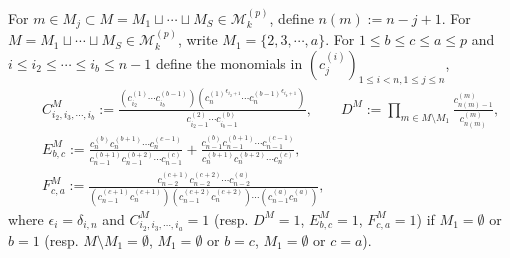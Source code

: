 For $m\in M_j\subset M=M_1\sqcup{\cdots}\sqcup M_S\in{\mathcal M}^{(p)}_k$, 
define $n(m):=n-j+1$.
For $M=M_1\sqcup{\cdots}\sqcup M_S\in{\mathcal M}^{(p)}_k$, write
$M_1=\{2,3,{\cdots},a\}$. 
For 
$1\leq b\leq c\leq a\leq p$ and $i\leq i_2\leq {\cdots}\leq i_b\leq n-1$
define the monomials in $({c_{j}^{(i)}})_{1\leq i<n,1\leq j\leq n}$, 
\begin{eqnarray}
&&C_{i_2,i_3,{\cdots},i_b}^M:=
\frac{({c_{i_2}^{(1)}}{\cdots}{c_{i_b}^{(b-1)}})({{c_{n}^{(1)}}}^{{\epsilon}_{i_2+1}}{\cdots} 
{{c_{n}^{(b-1)}}}^{{\epsilon}_{i_b+1}})}
{{c_{i_2-1}^{(2)}}{\cdots} {c_{i_b-1}^{(b)}}},{\qquad}
D^M:=\prod_{m\in M\setminus M_1}\frac{{c_{n(m)-1}^{(m)}}}{{c_{n(m)}^{(m)}}},
\label{CD}\\
&&
E^M_{b,c}:=\frac{
{c_{n}^{(b)}}{c_{n}^{(b+1)}}{\cdots}{c_{n}^{(c-1)}}}{{c_{n-1}^{(b+1)}}{c_{n-1}^{(b+2)}}{\cdots}{c_{n-1}^{(c)}}}
+\frac{
{c_{n-1}^{(b)}}{c_{n-1}^{(b+1)}}{\cdots}{c_{n-1}^{(c-1)}}}{{c_{n}^{(b+1)}}{c_{n}^{(b+2)}}{\cdots}{c_{n}^{(c)}}},
\label{EE}\\
&&F^M_{c,a}:=\frac{
{c_{n-2}^{(c+1)}}{c_{n-2}^{(c+2)}}{\cdots} {c_{n-2}^{(a)}}}
{({c_{n-1}^{(c+1)}}{c_{n}^{(c+1)}})({c_{n-1}^{(c+2)}}{c_{n}^{(c+2)}}){\cdots} 
({c_{n-1}^{(a)}}{c_{n}^{(a)}})},
\label{FF}
\end{eqnarray}
where ${\epsilon}_i={\delta}_{i,n}$ and $C_{i_2,i_3,{\cdots},i_a}^M=1$ 
(resp. $D^M=1$, $E^M_{b,c}=1$, $F^M_{c,a}=1$) if 
$M_1=\emptyset$ or $b=1$ (resp. $M\setminus M_1=\emptyset$, 
$M_1=\emptyset$ or $b=c$, $M_1=\emptyset$ or $c=a$).
